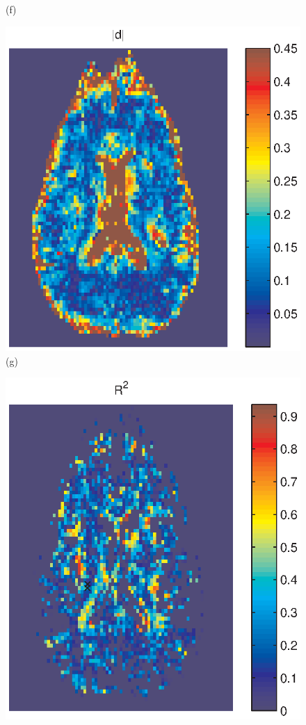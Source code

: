 \documentclass[authoryear,preprint,12pt]{elsarticle}
\begin{document}
\begin{figure}[p]
\begin{center}
\begin{minipage}[]{.30\textwidth}
       (f)
      \end{minipage}
      \begin{minipage}[]{.30\textwidth}
      \centering
      \includegraphics[width=\textwidth]{absdll2.eps}
       (g)
      \end{minipage}
      \begin{minipage}[]{.30\textwidth}
      \centering
      \includegraphics[width=\textwidth]{rsq255ny.eps}

\end{minipage}
\end{center}
\end{figure}
\end{document}
